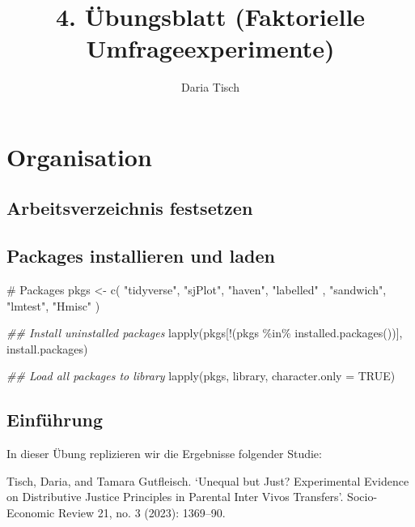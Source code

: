 \documentclass[
  letterpaper,
  DIV=11,
  numbers=noendperiod]{scrartcl}
\title{4. Übungsblatt (Faktorielle Umfrageexperimente)}
\author{Daria Tisch}
\date{}
\newenvironment{Shaded}{\begin{snugshade}}{\end{snugshade}}
\newcommand{\AttributeTok}[1]{\textcolor[rgb]{0.40,0.45,0.13}{#1}}
\newcommand{\CommentTok}[1]{\textcolor[rgb]{0.37,0.37,0.37}{#1}}
\newcommand{\ConstantTok}[1]{\textcolor[rgb]{0.56,0.35,0.01}{#1}}
\newcommand{\DocumentationTok}[1]{\textcolor[rgb]{0.37,0.37,0.37}{\textit{#1}}}
\newcommand{\FunctionTok}[1]{\textcolor[rgb]{0.28,0.35,0.67}{#1}}
\newcommand{\NormalTok}[1]{\textcolor[rgb]{0.00,0.23,0.31}{#1}}
\newcommand{\OtherTok}[1]{\textcolor[rgb]{0.00,0.23,0.31}{#1}}
\newcommand{\SpecialCharTok}[1]{\textcolor[rgb]{0.37,0.37,0.37}{#1}}
\newcommand{\StringTok}[1]{\textcolor[rgb]{0.13,0.47,0.30}{#1}}
\begin{document}
\maketitle


\section{Organisation}\label{organisation}

\subsection{Arbeitsverzeichnis
festsetzen}\label{arbeitsverzeichnis-festsetzen}

\subsection{Packages installieren und
laden}\label{packages-installieren-und-laden}

\begin{Shaded}
\begin{Highlighting}[]
\CommentTok{\# Packages}
\NormalTok{pkgs }\OtherTok{\textless{}{-}} \FunctionTok{c}\NormalTok{(}
  \StringTok{"tidyverse"}\NormalTok{,}
  \StringTok{"sjPlot"}\NormalTok{,}
  \StringTok{"haven"}\NormalTok{,}
  \StringTok{"labelled"}\NormalTok{ ,}
  \StringTok{"sandwich"}\NormalTok{,}
  \StringTok{"lmtest"}\NormalTok{,}
  \StringTok{"Hmisc"}
\NormalTok{) }

\DocumentationTok{\#\# Install uninstalled packages}
\FunctionTok{lapply}\NormalTok{(pkgs[}\SpecialCharTok{!}\NormalTok{(pkgs }\SpecialCharTok{\%in\%} \FunctionTok{installed.packages}\NormalTok{())], install.packages)}

\DocumentationTok{\#\# Load all packages to library}
\FunctionTok{lapply}\NormalTok{(pkgs, library, }\AttributeTok{character.only =} \ConstantTok{TRUE}\NormalTok{)}
\end{Highlighting}
\end{Shaded}

\subsection{Einführung}\label{einfuxfchrung}

In dieser Übung replizieren wir die Ergebnisse folgender Studie:

Tisch, Daria, and Tamara Gutfleisch. `Unequal but Just? Experimental
Evidence on Distributive Justice Principles in Parental Inter Vivos
Transfers'. Socio-Economic Review 21, no. 3 (2023): 1369--90.
\end{document}
